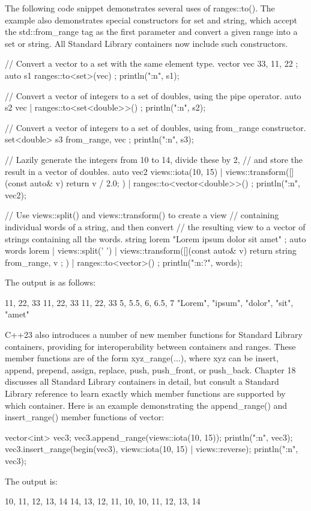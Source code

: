 The following code snippet demonstrates several uses of ranges::to(). The example also demonstrates special constructors for set and string, which accept the std::from\_range tag as the first parameter and convert a given range into a set or string. All Standard Library containers now include such constructors.

\begin{cpp}
// Convert a vector to a set with the same element type.
vector vec { 33, 11, 22 };
auto s1 { ranges::to<set>(vec) };
println("{:n}", s1);

// Convert a vector of integers to a set of doubles, using the pipe operator.
auto s2 { vec | ranges::to<set<double>>() };
println("{:n}", s2);

// Convert a vector of integers to a set of doubles, using from_range constructor.
set<double> s3 { from_range, vec };
println("{:n}", s3);

// Lazily generate the integers from 10 to 14, divide these by 2,
// and store the result in a vector of doubles.
auto vec2 { views::iota(10, 15)
    | views::transform([](const auto& v) { return v / 2.0; })
    | ranges::to<vector<double>>() };
println("{:n}", vec2);

// Use views::split() and views::transform() to create a view
// containing individual words of a string, and then convert
// the resulting view to a vector of strings containing all the words.
string lorem { "Lorem ipsum dolor sit amet" };
auto words { lorem | views::split(' ')
    | views::transform([](const auto& v) { return string { from_range, v }; })
    | ranges::to<vector>() };
println("{:n:?}", words);
\end{cpp}

The output is as follows:

\begin{shell}
11, 22, 33
11, 22, 33
11, 22, 33
5, 5.5, 6, 6.5, 7
"Lorem", "ipsum", "dolor", "sit", "amet"
\end{shell}

C++23 also introduces a number of new member functions for Standard Library containers, providing for interoperability between containers and ranges. These member functions are of the form xyz\_range(...), where xyz can be insert, append, prepend, assign, replace, push, push\_front, or push\_back. Chapter 18 discusses all Standard Library containers in detail, but consult a Standard Library reference to learn exactly which member functions are supported by which container. Here is an example demonstrating the append\_range() and insert\_range() member functions of vector:

\begin{cpp}
vector<int> vec3;
vec3.append_range(views::iota(10, 15));
println("{:n}", vec3);
vec3.insert_range(begin(vec3), views::iota(10, 15) | views::reverse);
println("{:n}", vec3);
\end{cpp}

The output is:

\begin{shell}
10, 11, 12, 13, 14
14, 13, 12, 11, 10, 10, 11, 12, 13, 14
\end{shell}








